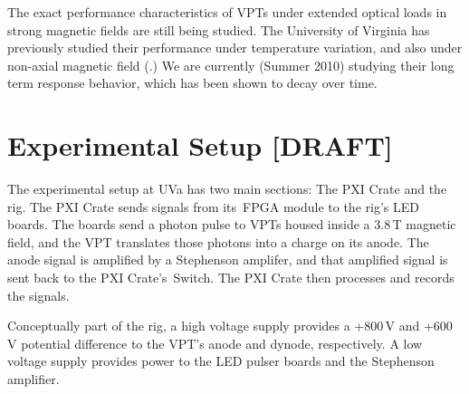 The exact performance characteristics of VPTs under extended optical loads in strong magnetic fields are still being studied.  The University of Virginia has previously studied their performance under temperature variation, and also under non-axial magnetic field (.)  We are currently (Summer 2010) studying their long term response behavior, which has been shown to decay over time.

\section{Experimental Setup [DRAFT]}
\label{sec:eq_intro:setup}

The experimental setup at UVa has two main sections: The \Gls{PXI Crate} and the \Gls{rig}.  The \gls{PXI Crate} sends signals from its\pxislottwo{}~\gls{FPGA} module to the rig's \glspl{LED board}.  The boards send a photon pulse to VPTs housed inside a 3.8\,T magnetic field, and the VPT translates those photons into a charge on its anode.  The anode signal is amplified by a Stephenson amplifer, and that amplified signal is sent back to the PXI Crate's~Switch.  The PXI Crate then processes and records the signals.

Conceptually part of the rig, a high voltage supply provides a +800\,V and +600\,V potential difference to the VPT's anode and dynode, respectively.  A low voltage supply provides power to the LED pulser boards and the Stephenson amplifier.

